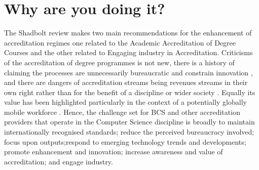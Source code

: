 \documentclass[sigconf]{acmart}
\begin{document}
\section {Why are you doing it?}	
The Shadbolt review \cite[p.~8]{shadbolt2016shadbolt} makes two main recommendations for the enhancement of accreditation regimes one related to the Academic Accreditation of Degree Courses and the other related to Engaging industry in Accreditation. Criticisms of the accreditation of degree programmes is not new, there is a history of claiming the processes are unnecessarily bureaucratic and constrain  innovation \cite{Harvey2004},  and there are dangers of accreditation streams being revenues streams in their own right rather than for the benefit of a discipline or wider society \cite{Knight_2015}. Equally its value has been highlighted particularly in the context of a potentially globally mobile workforce \cite{Knight_2015}. Hence, the challenge set for BCS and other accreditation providers that operate in the Computer Science discipline is broadly to maintain internationally recognised standards; reduce the perceived bureaucracy involved; focus upon outputs;respond to emerging technology trends and developments; promote enhancement and innovation; increase awareness and value of accreditation; and engage industry.

\begin{comment}

	"Recommendation 9 - Academic Accreditation of Degree Courses.
	
	BCS, IET and Tech Partnership should ensure that existing systems of degree course
	accreditation are flexible, agile, and enable HE providers to respond to changing
	demand and emerging technological trends and developments. Accreditation of courses
	should be focused on outputs. Accrediting bodies should work to increase awareness
	and value of accreditation so that it is valued by HE providers, students and employers,
	and consider how their role can provide a forum for engagement between HE and
	employers.

	Recommendation 10 - Engaging industry in accreditation.

	Employers, through employer groups, such as Tech Partnership, should engage more
	consistently with HE providers and BCS \& IET to ensure accreditation is effective and
	reflects current industry demand."
\end{comment} 
\end{document}
